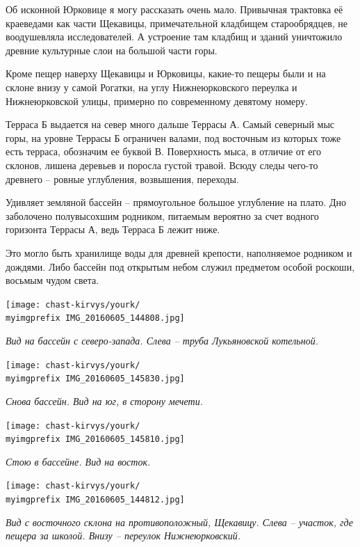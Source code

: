 Об исконной Юрковице я могу рассказать очень мало. Привычная трактовка её краеведами как части Щекавицы, примечательной кладбищем старообрядцев, не воодушевляла исследователей. А устроение там кладбищ и зданий уничтожило древние культурные слои на большой части горы.

Кроме пещер наверху Щекавицы и Юрковицы, какие-то пещеры были и на склоне внизу у самой Рогатки, на углу Нижнеюрковского переулка и Нижнеюрковской улицы, примерно по современному девятому номеру.

Терраса Б выдается на север много дальше Террасы А. Самый северный мыс горы, на уровне Террасы Б ограничен валами, под восточным из которых тоже есть терраса, обозначим ее буквой В. Поверхность мыса, в отличие от его склонов, лишена деревьев и поросла густой травой. Всюду следы чего-то древнего – ровные углубления, возвышения, переходы.

Удивляет земляной бассейн – прямоугольное большое углубление на плато. Дно заболочено полувысохшим родником, питаемым вероятно за счет водного горизонта Террасы А, ведь Терраса Б лежит ниже.

Это могло быть хранилище воды для древней крепости, наполняемое родником и дождями. Либо бассейн под открытым небом служил предметом особой роскоши, восьмым чудом света. 

\begin{center}
\texttt{[image: chast-kirvys/yourk/\\myimgprefix IMG\_20160605\_144808.jpg]}

\textit{Вид на бассейн с северо-запада. Слева – труба Лукьяновской котельной.}
\end{center}

\begin{center}
\texttt{[image: chast-kirvys/yourk/\\myimgprefix IMG\_20160605\_145830.jpg]}

\textit{Снова бассейн. Вид на юг, в сторону мечети.}
\end{center}

\begin{center}
\texttt{[image: chast-kirvys/yourk/\\myimgprefix IMG\_20160605\_145810.jpg]}

\textit{Стою в бассейне. Вид на восток.}
\end{center}

\newpage

\begin{center}
\texttt{[image: chast-kirvys/yourk/\\myimgprefix IMG\_20160605\_144812.jpg]}

\textit{Вид с восточного склона на противоположный, Щекавицу. Слева – участок, где пещера за школой. Внизу – переулок Нижнеюрковский.}
\end{center}

